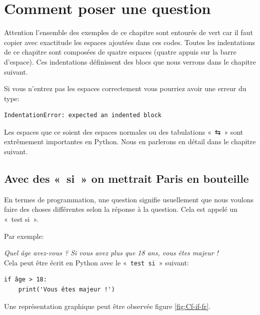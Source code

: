 


\chapter{Comment poser une question}

Attention l'ensemble des exemples de ce chapitre sont entourés de vert car il faut copier avec exactitude les espaces ajoutées dans ces codes. Toutes les indentations de ce chapitre sont composées de quatre espaces (quatre appuis sur la barre d'espace). Ces indentations définissent des blocs que nous verrons dans le chapitre suivant.

Si vous n'entrez pas les espaces correctement vous pourriez avoir une erreur du type:

\begin{Verbatim}[frame=single,rulecolor=\color{red}, label=erreur]
IndentationError: expected an indented block
\end{Verbatim}

\setsansfont[Mapping=tex-text]{DejaVu Sans}
Les espaces que ce soient des espaces normales ou des tabulations «~\textsf{⇆}~» sont extrêmement  importantes en Python. Nous en parlerons en détail dans le chapitre suivant.

\section{Avec des «~si~» on mettrait Paris en bouteille}
En termes de programmation, une question signifie usuellement que nous voulons faire des choses différentes selon 
la réponse à la question. Cela est appelé un «~test si~».

Par exemple:

\emph{Quel âge avez-vous ? Si vous avez plus que 18 ans, vous êtes majeur !}\\


Cela peut être écrit en Python avec le «~\texttt{test si}~» suivant:
\begin{Verbatim}[frame=single,rulecolor=\color{gray}, label=ne pas saisir]
if âge > 18:
    print('Vous êtes majeur !')
\end{Verbatim}

Une représentation graphique peut être observée figure \ref{fig:Cf-if-fr}.

